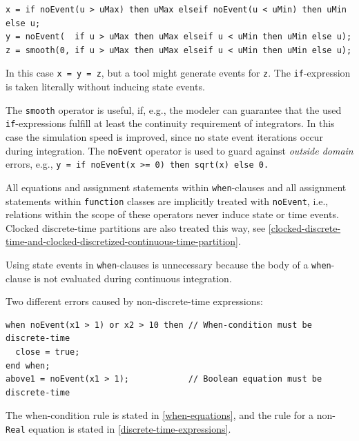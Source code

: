 \begin{example}
\begin{lstlisting}[language=modelica]
x = if noEvent(u > uMax) then uMax elseif noEvent(u < uMin) then uMin else u;
y = noEvent(  if u > uMax then uMax elseif u < uMin then uMin else u);
z = smooth(0, if u > uMax then uMax elseif u < uMin then uMin else u);
\end{lstlisting}

In this case \lstinline!x = y = z!, but a tool might generate events for \lstinline!z!.
The \lstinline!if!-expression is taken literally without inducing state events.

The \lstinline!smooth! operator is useful, if, e.g., the modeler can guarantee that the used \lstinline!if!-expressions fulfill at least the continuity requirement of integrators.
In this case the simulation speed is improved, since no state event iterations occur during integration.
The \lstinline!noEvent! operator is used to guard against \emph{outside domain} errors, e.g., \lstinline!y = if noEvent(x >= 0) then sqrt(x) else 0.!
\end{example}

All equations and assignment statements within \lstinline!when!-clauses and all assignment statements within \lstinline!function! classes are implicitly treated with \lstinline!noEvent!, i.e., relations within the scope of these operators never induce state or time events.
Clocked discrete-time partitions are also treated this way, see \cref{clocked-discrete-time-and-clocked-discretized-continuous-time-partition}.

\begin{nonnormative}
Using state events in \lstinline!when!-clauses is unnecessary because the body of a \lstinline!when!-clause is not evaluated during continuous integration.
\end{nonnormative}

\begin{example}
Two different errors caused by non-discrete-time expressions:
\begin{lstlisting}[language=modelica]
when noEvent(x1 > 1) or x2 > 10 then // When-condition must be discrete-time
  close = true;
end when;
above1 = noEvent(x1 > 1);            // Boolean equation must be discrete-time
\end{lstlisting}
The when-condition rule is stated in \cref{when-equations}, and the rule for a non-\lstinline!Real! equation is stated in \cref{discrete-time-expressions}.
\end{example}

